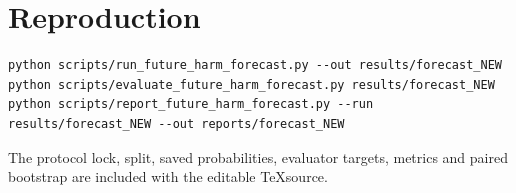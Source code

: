 \documentclass[10pt,a4paper]{article}
\begin{document}
\section{Reproduction}
\begin{verbatim}
python scripts/run_future_harm_forecast.py --out results/forecast_NEW
python scripts/evaluate_future_harm_forecast.py results/forecast_NEW
python scripts/report_future_harm_forecast.py --run results/forecast_NEW --out reports/forecast_NEW
\end{verbatim}
The protocol lock, split, saved probabilities, evaluator targets, metrics and paired bootstrap are included with the editable \TeX source.
\end{document}

